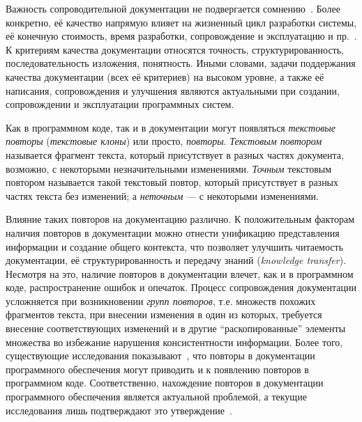 Важность сопроводительной документации не подвергается сомнению~\cite{kipyegen2013importance,chomal2014significance}.
Более конкретно, её качество напрямую влияет на жизненный цикл разработки системы, её конечную стоимость, время разработки, сопровождение и эксплуатацию и пр.~\cite{plosch2014value}. 
К критериям качества документации относятся точность, структурированность, последовательность изложения, понятность.
Иными словами, задачи поддержания качества документации (всех её критериев) на высоком уровне, а также её написания, сопровождения и улучшения являются актуальными при создании, сопровождении и эксплуатации программных систем.

Как в программном коде, так и в документации могут появляться \emph{текстовые повторы} (\emph{текстовые клоны}) или просто, \emph{повторы}.
\emph{Текстовым повтором} называется фрагмент текста, который присутствует в разных частях документа, возможно, с некоторыми незначительными изменениями.
\emph{Точным} текстовым повтором называется такой текстовый повтор, который присутствует в разных частях текста без изменений; а \emph{неточным} --- с некоторыми изменениями. 

Влияние таких повторов на документацию различно.
К положительным факторам наличия {повторов} в документации можно отнести унификацию представления информации и создание общего контекста, что позволяет улучшить читаемость документации, её структурированность и передачу знаний (\emph{knowledge transfer}).
Несмотря на это, наличие повторов в документации влечет, как и в программном коде,  распространение ошибок и опечаток.
Процесс сопровождения документации усложняется при возникновении \emph{групп повторов}, т.е. множеств похожих фрагментов текста, при внесении изменения в один из которых, требуется внесение соответствующих изменений и в другие ``раскопированные'' элементы множества во избежание нарушения консистентности информации.
Более того, существующие исследования показывают~\cite{juergens2010can}, что повторы в документации программного обеспечения могут приводить и к появлению повторов в программном коде.
Соответственно, нахождение повторов в документации программного обеспечения является актуальной проблемой, а текущие исследования лишь подтверждают это утверждение~\cite{horie2010tool, poruban2014reusable, poruban2016preliminary, juergens2010can, oumaziz2017documentation}.

